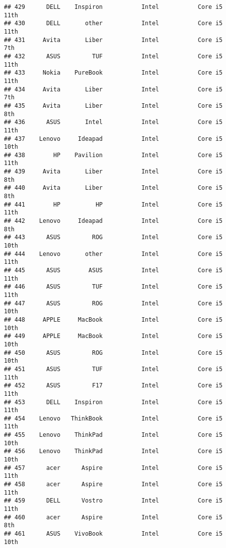 \documentclass[
]{article}
\begin{document}
\begin{verbatim}
## 429      DELL    Inspiron           Intel           Core i5            11th
## 430      DELL       other           Intel           Core i5            11th
## 431     Avita       Liber           Intel           Core i5             7th
## 432      ASUS         TUF           Intel           Core i5            11th
## 433     Nokia    PureBook           Intel           Core i5            11th
## 434     Avita       Liber           Intel           Core i5             7th
## 435     Avita       Liber           Intel           Core i5             8th
## 436      ASUS       Intel           Intel           Core i5            11th
## 437    Lenovo     Ideapad           Intel           Core i5            10th
## 438        HP    Pavilion           Intel           Core i5            11th
## 439     Avita       Liber           Intel           Core i5             8th
## 440     Avita       Liber           Intel           Core i5             8th
## 441        HP          HP           Intel           Core i5            11th
## 442    Lenovo     Ideapad           Intel           Core i5             8th
## 443      ASUS         ROG           Intel           Core i5            10th
## 444    Lenovo       other           Intel           Core i5            11th
## 445      ASUS        ASUS           Intel           Core i5            11th
## 446      ASUS         TUF           Intel           Core i5            11th
## 447      ASUS         ROG           Intel           Core i5            10th
## 448     APPLE     MacBook           Intel           Core i5            10th
## 449     APPLE     MacBook           Intel           Core i5            10th
## 450      ASUS         ROG           Intel           Core i5            10th
## 451      ASUS         TUF           Intel           Core i5            11th
## 452      ASUS         F17           Intel           Core i5            11th
## 453      DELL    Inspiron           Intel           Core i5            11th
## 454    Lenovo   ThinkBook           Intel           Core i5            11th
## 455    Lenovo    ThinkPad           Intel           Core i5            10th
## 456    Lenovo    ThinkPad           Intel           Core i5            10th
## 457      acer      Aspire           Intel           Core i5            11th
## 458      acer      Aspire           Intel           Core i5            11th
## 459      DELL      Vostro           Intel           Core i5            11th
## 460      acer      Aspire           Intel           Core i5             8th
## 461      ASUS    VivoBook           Intel           Core i5            10th

\end{verbatim}
\end{document}
